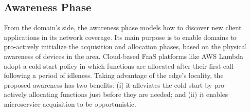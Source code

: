 


\subsection*{Awareness Phase}\label{sec:A3-E-awareness}


From the domain's side, the awareness phase models how to discover new client applications in its network coverage. Its main purpose is to enable domains to pro-actively initialize the acquisition and allocation phases, based on the physical awareness of devices in the area. Cloud-based FaaS platforms like AWS Lambda adopt a cold start policy in which functions are allocated after their first call following a period of idleness. Taking advantage of the edge's locality, the proposed awareness has two benefits: (i) it alleviates the cold start by pro-actively allocating functions just before they are needed; and (ii) it enables microservice acquisition to be opportunistic.


